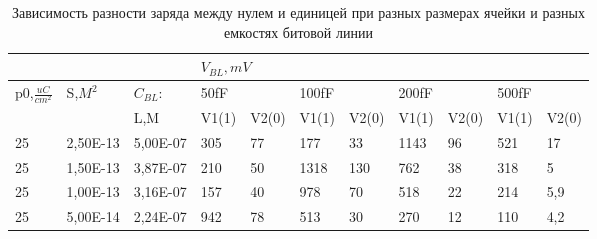 \documentclass[a4paper,12pt]{article} %
\begin{document}
\begin{table}[h]
\centering
\begin{tabular}{|l|l|l|l|l|l|l|l|l|l|l|}
\hline
\multicolumn{3}{|l|}{}                                                        & \multicolumn{8}{l|}{$V_{BL},mV$}                                                                                 \\ \hline
\multirow{2}{*}{p0,$\frac{uC}{cm^2} $} & \multirow{2}{*}{S,$M^2$} & $C_{BL}$: & \multicolumn{2}{l|}{50fF} & \multicolumn{2}{l|}{100fF} & \multicolumn{2}{l|}{200fF} & \multicolumn{2}{l|}{500fF} \\ \cline{3-11} 
                                       &                          & L,M       & V1(1)       & V2(0)       & V1(1)        & V2(0)       & V1(1)        & V2(0)       & V1(1)        & V2(0)       \\ \hline
25                                     & 2,50E-13                 & 5,00E-07  & 305         & 77          & 177          & 33          & 1143         & 96          & 521          & 17          \\ \hline
25                                     & 1,50E-13                 & 3,87E-07  & 210         & 50          & 1318         & 130         & 762          & 38          & 318          & 5           \\ \hline
25                                     & 1,00E-13                 & 3,16E-07  & 157         & 40          & 978          & 70          & 518          & 22          & 214          & 5,9         \\ \hline
25                                     & 5,00E-14                 & 2,24E-07  & 942         & 78          & 513          & 30          & 270          & 12          & 110          & 4,2         \\ \hline
\end{tabular}
\caption{Зависимость разности заряда между нулем и единицей при разных размерах ячейки и разных емкостях битовой линии}
\label{tab:c_bl}
\end{table}
\end{document}
